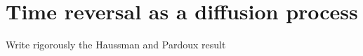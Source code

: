 \section{Time reversal as a diffusion process}
\label{sec:time-reversal-as}

Write rigorously the Haussman and Pardoux result 

